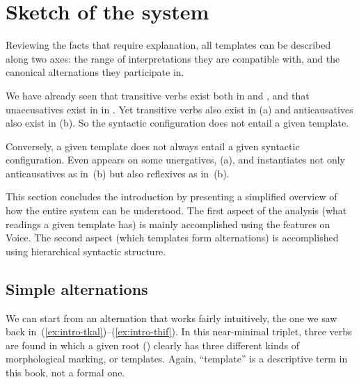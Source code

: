 \section{Sketch of the system} \label{intro:sketch}
Reviewing the facts that require explanation, all templates can be described along two axes: the range of interpretations they are compatible with, and the canonical alternations they participate in.

We have already seen that transitive verbs exist both in {\tkal} and {\thif}, and that unaccusatives exist in in {\tnif}. Yet transitive verbs also exist in {\tpie} (\nextx a) and anticausatives also exist in {\thit} (\nextx b). So the syntactic configuration does not entail a given template.
\ex\label{ex:counter1}
\xe

Conversely, a given template does not always entail a given syntactic configuration. Even {\tnif} appears on some unergatives, (\nextx a), and {\thit} instantiates not only anticausatives as in~(\lastx b) but also reflexives as in~(\nextx b).
\ex\label{ex:counter2}
\xe

This section concludes the introduction by presenting a simplified overview of how the entire system can be understood. The first aspect of the analysis (what readings a given template has) is mainly accomplished using the features on Voice. The second aspect (which templates form alternations) is accomplished using hierarchical syntactic structure.

	\subsection{Simple alternations}
We can start from an alternation that works fairly intuitively, the one we saw back in~(\ref{ex:intro-tkal})--(\ref{ex:intro-thif}). In this near-minimal triplet, three verbs are found in which a given root () clearly has three different kinds of morphological marking, or templates. Again, ``template'' is a descriptive term in this book, not a formal one.


